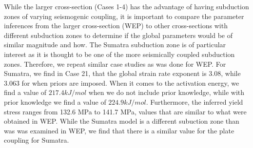 \documentclass[12pt]{article}
\begin{document}
While the larger cross-section (Cases 1-4) has the advantage of having subduction zones of varying seismogenic coupling, it is important to compare the parameter inferences from the larger cross-section (WEP) to other cross-sections with different subduction zones to determine if the global parameters would be of similar magnitude and how. 
The Sumatra subduction zone is of particular interest as it is thought to be one of the more seismically coupled subduction zones. Therefore, we repeat similar case studies as was done for WEP. For Sumatra, we find in Case 21, that the global strain rate exponent is 3.08, while 3.063 for when priors are imposed. When it comes to the activation energy, we find a value of $217.4 kJ/mol$ when we do not include prior knowledge, while 
with prior knowledge we find a value of $224.9 kJ/mol$. Furthermore, the inferred yield stress ranges from 132.6 MPa to 141.7 MPa, values that are similar to what were obtained in WEP. While the Sumatra model is a different subuction zone than was was examined in WEP, we find that there is a similar value for the plate coupling for Sumatra.
\end{document}
